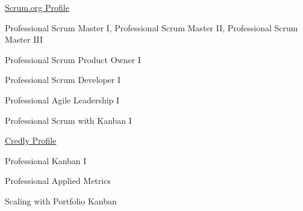 

\begin{cventries}

	\cventry
	{
	} %
	{
	} %
	{
		\href{https://www.scrum.org/user/601291}{Scrum.org Profile}
	} %
	{
	} %
	{
		\begin{cvitems} %
			\item {
				Professional Scrum Master I, Professional Scrum Master II, Professional Scrum Master III
			}
			\item {
				Professional Scrum Product Owner I
			}
			\item {
				Professional Scrum Developer I
			}
			\item {
				Professional Agile Leadership I
			}
			\item {
				Professional Scrum with Kanban I
			}		
		\end{cvitems}
	}
  	\cventry
  	{  		
  	} %
  	{
  		\linebreak
  	} %
  	{
  		\href{https://www.credly.com/users/benjamin-huser}{Credly Profile}
  	} %
  	{
  	} %
  	{
  		\begin{cvitems} %
  			\item {
  				Professional Kanban I
  			}
  			\item {
  				Professional Applied Metrics
  			}
  			\item {
  				Scaling with Portfolio Kanban
  			}
  			\item {
  			}
  		\end{cvitems}
  	}
  	
  	\cventry
  	{ 	}
  	{  	}
  	{  	}
  	{  	}
  	{  	}
\end{cventries}
